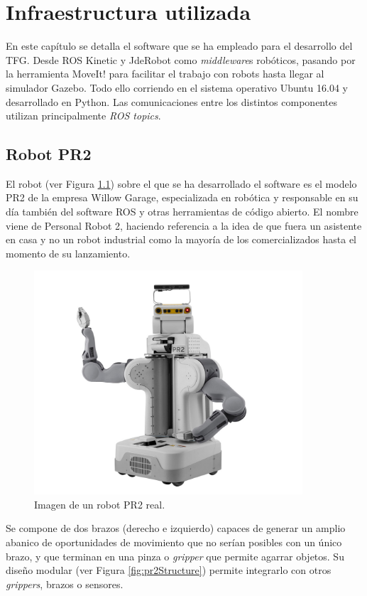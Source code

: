 \documentclass[12pt,spanish,chapterprefix, numbers=noenddot]{book}
\numberwithin{equation}{section}
\numberwithin{figure}{section}
\begin{document}
\chapter{Infraestructura utilizada}
En este capítulo se detalla el software que se ha empleado para el desarrollo del TFG. Desde ROS Kinetic y JdeRobot como \textit{middleware}s robóticos, pasando por la herramienta MoveIt! para facilitar el trabajo con robots hasta llegar al simulador Gazebo. Todo ello corriendo en el sistema operativo Ubuntu 16.04 y desarrollado en Python.  Las comunicaciones entre los distintos componentes utilizan principalmente \textit{ROS topics}. 

\section{Robot PR2}
El robot (ver Figura \ref{fig:pr2}) sobre el que se ha desarrollado el software es el modelo PR2 \cite{pr2} de la empresa Willow Garage, especializada en robótica y responsable en su día también del software ROS y otras herramientas de código abierto. El nombre viene de Personal Robot 2, haciendo referencia a la idea de que fuera un asistente en casa y no un robot industrial como la mayoría de los comercializados hasta el momento de su lanzamiento. 

\begin{figure}[hbt!]
\centering
\includegraphics[width=10cm]{Figs/PR2_image.jpg}
\par
\caption{\label{fig:pr2}Imagen de un robot PR2 real.}
\end{figure}

Se compone de dos brazos (derecho e izquierdo) capaces de generar un amplio abanico de oportunidades de movimiento que no serían posibles con un único brazo, y que terminan en una pinza o \textit{gripper} que permite agarrar objetos.
Su diseño modular (ver Figura \ref{fig:pr2Structure}) permite integrarlo con otros \textit{grippers}, brazos o sensores.
\end{document}
